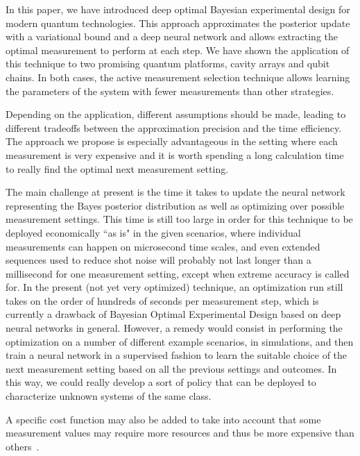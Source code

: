 \documentclass[10pt]{iopart}  %
\begin{document}
In this paper, we have introduced deep optimal Bayesian experimental design for modern quantum technologies.
This approach approximates the posterior update with a variational bound and a deep neural network and allows extracting the optimal measurement to perform at each step.
We have shown the application of this technique to two promising quantum platforms, cavity arrays and qubit chains.
In both cases, the active measurement selection technique allows learning the parameters of the system with fewer measurements than other strategies.

Depending on the application, different assumptions should be made, leading to different tradeoffs between the approximation precision and the time efficiency.
The approach we propose is especially advantageous in the setting where each measurement is very expensive and it is worth spending a long calculation time to really find the optimal next measurement setting.

The main challenge at present is the time it takes to update the neural network representing the Bayes posterior distribution as well as optimizing over possible measurement settings.
This time is still too large in order for this technique to be deployed economically ``as is" in the given scenarios, where individual measurements can happen on microsecond time scales, and even extended sequences used to reduce shot noise will probably not last longer than a millisecond for one measurement setting, except when extreme accuracy is called for.
In the present (not yet very optimized) technique, an optimization run still takes on the order of hundreds of seconds per measurement step, which is currently a drawback of  Bayesian Optimal Experimental Design based on deep neural networks in general.
However, a remedy would consist in performing the optimization on a number of different example scenarios, in simulations, and then train a neural network in a supervised fashion to learn the suitable choice of the next measurement setting based on all the previous settings and outcomes.
In this way, we could really develop a sort of policy that can be deployed to characterize unknown systems of the same class.

A specific cost function may also be added to take into account that some measurement values may require more resources and thus be more expensive than others~\cite{settles_active_2012}.
\end{document}
